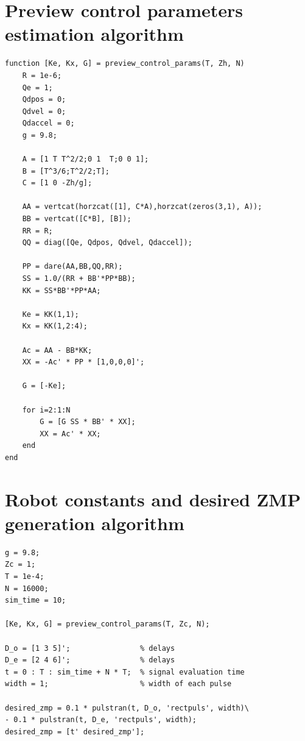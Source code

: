 \documentclass[12pt,a4paper]{report}
\begin{document}
	
	
	
	\begin{appendices}
		\chapter{Preview control parameters estimation algorithm}
			\begin{lstlisting}
function [Ke, Kx, G] = preview_control_params(T, Zh, N)
	R = 1e-6;
	Qe = 1;
	Qdpos = 0;
	Qdvel = 0;
	Qdaccel = 0;
	g = 9.8;
	
	A = [1 T T^2/2;0 1  T;0 0 1];
	B = [T^3/6;T^2/2;T];
	C = [1 0 -Zh/g];
	
	AA = vertcat(horzcat([1], C*A),horzcat(zeros(3,1), A));
	BB = vertcat([C*B], [B]);
	RR = R;
	QQ = diag([Qe, Qdpos, Qdvel, Qdaccel]);
	
	PP = dare(AA,BB,QQ,RR);
	SS = 1.0/(RR + BB'*PP*BB);
	KK = SS*BB'*PP*AA;
	
	Ke = KK(1,1);
	Kx = KK(1,2:4);
	
	Ac = AA - BB*KK;
	XX = -Ac' * PP * [1,0,0,0]';
	
	G = [-Ke];
	
	for i=2:1:N
		G = [G SS * BB' * XX];
		XX = Ac' * XX;
	end
end
			\end{lstlisting}
		\chapter{Robot constants and desired ZMP generation algorithm}
			\begin{lstlisting}
g = 9.8;
Zc = 1;
T = 1e-4;
N = 16000;
sim_time = 10;

[Ke, Kx, G] = preview_control_params(T, Zc, N);

D_o = [1 3 5]';                % delays
D_e = [2 4 6]';                % delays
t = 0 : T : sim_time + N * T;  % signal evaluation time
width = 1;                     % width of each pulse

desired_zmp = 0.1 * pulstran(t, D_o, 'rectpuls', width)\
- 0.1 * pulstran(t, D_e, 'rectpuls', width);
desired_zmp = [t' desired_zmp'];
			\end{lstlisting}
	\end{appendices}
  
\end{document}
